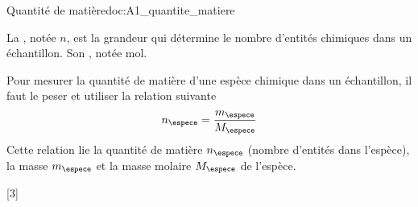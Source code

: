 \begin{doc}{Quantité de matière}{doc:A1_quantite_matiere}
  \begin{importants}
    La , notée $n$, est la grandeur qui détermine le nombre d'entités chimiques dans un échantillon.
    Son , notée \unit{\mole}.
  \end{importants}

  Pour mesurer la quantité de matière d'une espèce chimique dans un échantillon,
  il faut le peser et utiliser la relation suivante
  \begin{equation*}
    n_\espece = \dfrac{m_\espece}{M_\espece}
  \end{equation*}
  Cette relation lie la quantité de matière $n_\espece$ (nombre d'entités dans l'espèce), la masse $m_\espece$ et la masse molaire $M_\espece$ de l'espèce.
\end{doc}

[3]

